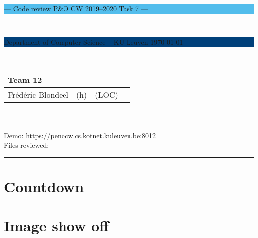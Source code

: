 \documentclass[a4paper,11pt]{article}
\begin{document}
\noindent
\colorbox[HTML]{52BDEC}{\bfseries\parbox{\textwidth}{\centering\large
  --- Code review P\&O CW 2019--2020 Task 7 ---
}}
\\[-1mm]
\colorbox[HTML]{00407A}{\bfseries\color{white}\parbox{\textwidth}{
  Department of Computer Science -- KU Leuven
  \hfill
  \today
}}
\\

\smallskip

\noindent
\begin{tabular}{*4l}
\toprule
\multicolumn{3}{l}{\large\textbf{Team 12}} \\
\midrule
Frédéric Blondeel & (h) &  (LOC) \\ %
\bottomrule
\hline
\end{tabular}\\
\\
Demo: \url{https://penocw.cs.kotnet.kuleuven.be:8012} \\
Files reviewed: 

\noindent
{\color[HTML]{52BDEC} \rule{\linewidth}{1mm} }

\smallskip

\section{Countdown}


\section{Image show off}
\end{document}
